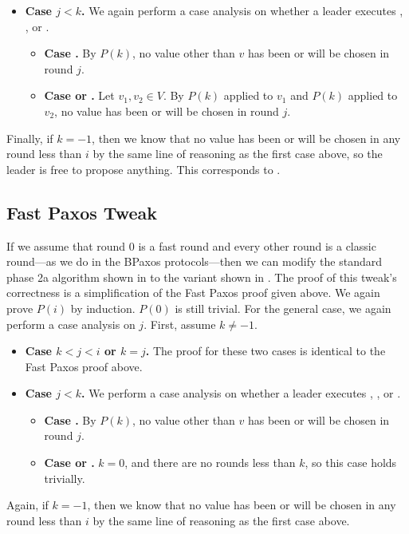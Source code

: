 \begin{itemize}
  \item \textbf{Case $j < k$.}
    We again perform a case analysis on whether a leader executes
    , , or
    .
    \begin{itemize}
      \item \textbf{Case .}
        By $P(k)$, no value other than $v$ has been or will be chosen in round
        $j$.
      \item \textbf{Case  or
                         .}
        Let $v_1, v_2 \in V$. By $P(k)$ applied to $v_1$ and $P(k)$ applied to
        $v_2$, no value has been or will be chosen in round $j$.
    \end{itemize}
\end{itemize}

Finally, if $k = -1$, then we know that no value has been or will be chosen in
any round less than $i$ by the same line of reasoning as the first case above,
so the leader is free to propose anything. This corresponds to
.

\subsection{Fast Paxos Tweak}
If we assume that round $0$ is a fast round and every other round is a classic
round---as we do in the BPaxos protocols---then we can modify the standard
phase 2a algorithm shown in  to the variant shown in
.
%
The proof of this tweak's correctness is a simplification of the Fast Paxos
proof given above. We again prove $P(i)$ by induction. $P(0)$ is still trivial.
For the general case, we again perform a case analysis on $j$. First, assume $k
\neq -1$.  \begin{itemize}
  \item \textbf{Case $k < j < i$ or $k = j$.}
    The proof for these two cases is identical to the Fast Paxos proof above.

  \item \textbf{Case $j < k$.}
    We perform a case analysis on whether a leader executes
    , , or
    .
    \begin{itemize}
      \item \textbf{Case .}
        By $P(k)$, no value other than $v$ has been or will be chosen in round
        $j$.
      \item \textbf{Case  or
                         .}
        $k = 0$, and there are no rounds less than $k$, so this case
        holds trivially.
    \end{itemize}
\end{itemize}

Again, if $k = -1$, then we know that no value has been or will be chosen in
any round less than $i$ by the same line of reasoning as the first case above.
